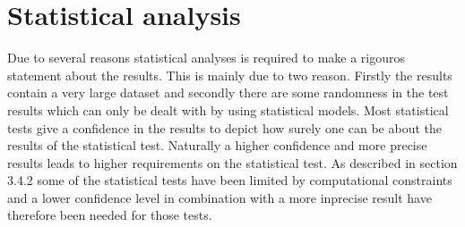\documentclass[a4paper,11pt]{kth-mag}
\begin{document}
\section{Statistical analysis}
Due to several reasons statistical analyses is required to make a rigouros statement about the results. 
This is mainly due to two reason.
Firstly the results contain a very large dataset and secondly there are some randomness in the test results which can only be dealt with by using statistical models. 
Most statistical tests give a confidence in the results to depict how surely one can be about the results of the statistical test. Naturally a higher confidence and more precise results leads to higher requirements on the statistical test. As described in section 3.4.2 some of the statistical tests have been limited by computational constraints and a lower confidence level in combination with a more inprecise result have therefore been needed for those tests.
\end{document}
